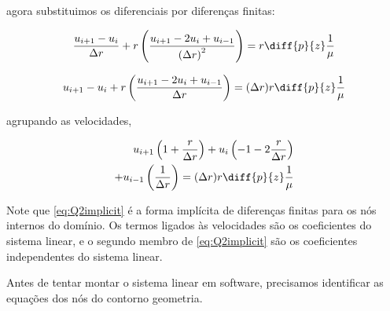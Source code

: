 \noindent agora substituimos os diferenciais por diferenças finitas:

\[ \frac{u_{i+1} - u_i}{\Delta r} + r \left(\frac{u_{i+1} - 2u_i + u_{i-1}}{\left(\Delta r\right)^2}\right) = r \diff{p}{z} \frac{1}{\mu} \]

\[ u_{i+1} - u_i + r \left(\frac{u_{i+1} - 2u_i + u_{i-1}}{\Delta r}\right) = (\Delta r) r \diff{p}{z} \frac{1}{\mu} \]

\noindent agrupando as velocidades,

\begin{equation}\label{eq:Q2implicit}
    \begin{split}
        u_{i+1} \left(1 + \frac{r}{\Delta r}\right) + u_i \left(-1 - 2\frac{r}{\Delta r}\right) \\ + u_{i-1} \left(\frac{1}{\Delta r}\right) = (\Delta r) r \diff{p}{z} \frac{1}{\mu}
    \end{split}
\end{equation}

Note que \eqref{eq:Q2implicit} é a forma implícita de diferenças finitas para os nós
internos do domínio. Os termos ligados às velocidades são os coeficientes do sistema linear,
e o segundo membro de \eqref{eq:Q2implicit} são os coeficientes independentes do sistema linear.

Antes de tentar montar o sistema linear em software, precisamos identificar as equações dos nós do 
contorno geometria. 


